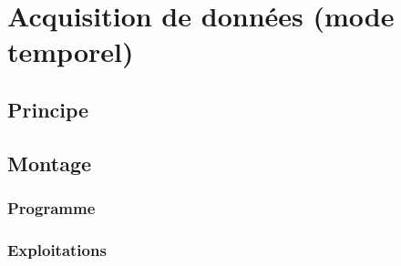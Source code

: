 \documentclass[a4paper,10pt,french]{book}
\begin{document}
\section{Acquisition de données (mode temporel)}
\label{\detokenize{5_aller_plus_loin/3_acquisition_temporel:acquisition-de-donnees-mode-temporel}}\label{\detokenize{5_aller_plus_loin/3_acquisition_temporel::doc}}

\subsection{Principe}
\label{\detokenize{5_aller_plus_loin/3_acquisition_temporel:principe}}

\subsection{Montage}
\label{\detokenize{5_aller_plus_loin/3_acquisition_temporel:montage}}

\subsubsection{Programme}
\label{\detokenize{5_aller_plus_loin/3_acquisition_temporel:programme}}

\subsubsection{Exploitations}
\label{\detokenize{5_aller_plus_loin/3_acquisition_temporel:exploitations}}


\renewcommand{\indexname}{Index}
\printindex
\end{document}
